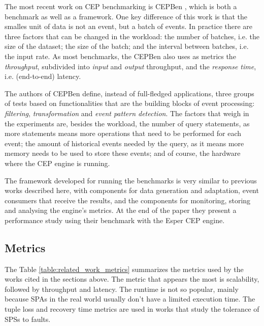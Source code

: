 \documentclass[ppgc,diss,english]{iiufrgs}
\begin{document}

The most recent work on CEP benchmarking is CEPBen \cite{li2014cepben}, which is both a benchmark as well as a framework. One key difference of this work is that the smalles unit of data is not an event, but a batch of events. In practice there are three factors that can be changed in the workload: the number of batches, i.e. the size of the dataset; the size of the batch; and the interval between batches, i.e. the input rate. As most benchmarks, the CEPBen also uses as metrics the \emph{throughput}, subdivided into \emph{input} and \emph{output} throughput, and the \emph{response time}, i.e. (end-to-end) latency.

The authors of CEPBen define, instead of full-fledged applications, three groups of tests based on functionalities that are the building blocks of event processing: \emph{filtering}, \emph{transformation} and \emph{event pattern detection}. The factors that weigh in the experiments are, besides the workload, the number of query statements, as more statements means more operations that need to be performed for each event; the amount of historical events needed by the query, as it means more memory needs to be used to store these events; and of course, the hardware where the CEP engine is running.

The framework developed for running the benchmarks is very similar to previous works described here, with components for data generation and adaptation, event consumers that receive the results, and the components for monitoring, storing and analysing the engine's metrics. At the end of the paper they present a performance study using their benchmark with the Esper CEP engine.

\subsection{Metrics}
\label{subsec:esp:metrics}

The Table \ref{table:related_work_metrics} summarizes the metrics used by the works cited in the sections above. The metric that appears the most is scalability, followed by throughput and latency. The runtime is not so popular, mainly because SPAs in the real world usually don't have a limited execution time. The tuple loss and recovery time metrics are used in works that study the tolerance of SPSs to faults.
\end{document}
